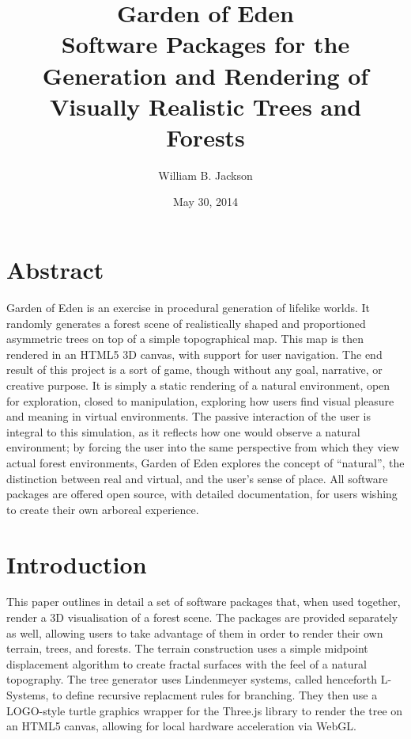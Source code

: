 \documentclass{article}
\title{Garden of Eden \\ Software Packages for the Generation and Rendering of Visually
Realistic Trees and Forests}
\author{William B. Jackson}
\date{May 30, 2014}
\newcommand{\tab}{\hspace*{2em}}
\begin{document}
    \maketitle
    \pagebreak

    \setcounter{tocdepth}{2}
    \tableofcontents



    \section{Abstract} %
    \tab Garden of Eden is an exercise in procedural generation of lifelike worlds. It randomly
generates a forest scene of realistically shaped and proportioned asymmetric trees on top of a
simple topographical map. This map is then rendered in an HTML5 3D canvas, with support for user
navigation. The end result of this project is a sort of game, though without any goal, narrative, or creative purpose.
It is simply a static rendering of a natural environment, open for exploration, closed to
manipulation, exploring how users find visual pleasure and meaning in virtual environments. The
passive interaction of the user is integral to this simulation, as it reflects how one would observe a
natural environment; by forcing the user into the same perspective from which they view actual
forest environments, Garden of Eden explores the concept of “natural”, the distinction between
real and virtual, and the user's sense of place. All software packages are offered open source,
with detailed documentation, for users wishing to create their own arboreal experience.
 

    \section{Introduction}
    \tab This paper outlines in detail a set of software packages that, when used together, render
a 3D visualisation of a forest scene. The packages are provided separately as well, allowing users
to take advantage of them in order to render their own terrain, trees, and forests. The terrain
construction uses a simple midpoint displacement algorithm\cite{fournier82} to create fractal
surfaces with the feel of a natural topography. The tree generator uses Lindenmeyer
systems\cite{abp96}, called henceforth L-Systems, to define recursive replacment rules for
branching. They then use a LOGO-style turtle graphics wrapper for the Three.js library to render
the tree on an HTML5 canvas, allowing for local hardware acceleration via WebGL.
\end{document}
